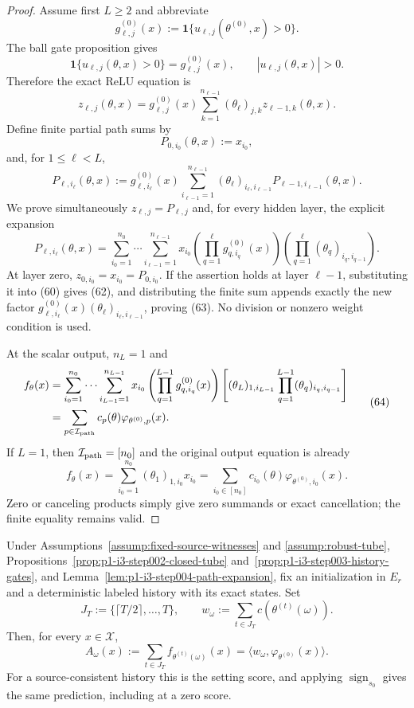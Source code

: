 \begin{proof}
Assume first $L\geq2$ and abbreviate
\[
g_{\ell,j}^{(0)}(x):=\mathbf1\{u_{\ell,j}(\theta^{(0)},x)>0\}.
\tag{58}
\]
The ball gate proposition gives
\[
\mathbf1\{u_{\ell,j}(\theta,x)>0\}=g_{\ell,j}^{(0)}(x),
\qquad |u_{\ell,j}(\theta,x)|>0.
\tag{59}
\]
Therefore the exact ReLU equation is
\[
z_{\ell,j}(\theta,x)=g_{\ell,j}^{(0)}(x)
\sum_{k=1}^{n_{\ell-1}}(\theta_\ell)_{j,k}
z_{\ell-1,k}(\theta,x).
\tag{60}
\]
Define finite partial path sums by
\[
P_{0,i_0}(\theta,x):=x_{i_0},
\tag{61}
\]
and, for $1\leq\ell<L$,
\[
P_{\ell,i_\ell}(\theta,x):=g_{\ell,i_\ell}^{(0)}(x)
\sum_{i_{\ell-1}=1}^{n_{\ell-1}}
(\theta_\ell)_{i_\ell,i_{\ell-1}}
P_{\ell-1,i_{\ell-1}}(\theta,x).
\tag{62}
\]
We prove simultaneously $z_{\ell,j}=P_{\ell,j}$ and, for every hidden
layer, the explicit expansion
\[
P_{\ell,i_\ell}(\theta,x)=
\sum_{i_0=1}^{n_0}\cdots\sum_{i_{\ell-1}=1}^{n_{\ell-1}}
x_{i_0}
\left(\prod_{q=1}^{\ell}g_{q,i_q}^{(0)}(x)\right)
\left(\prod_{q=1}^{\ell}(\theta_q)_{i_q,i_{q-1}}\right).
\tag{63}
\]
At layer zero, $z_{0,i_0}=x_{i_0}=P_{0,i_0}$.  If the assertion holds at
layer $\ell-1$, substituting it into (60) gives (62), and distributing the
finite sum appends exactly the new factor
$g_{\ell,i_\ell}^{(0)}(x)(\theta_\ell)_{i_\ell,i_{\ell-1}}$, proving (63).
No division or nonzero weight condition is used.

At the scalar output, $n_L=1$ and
\[
\begin{aligned}
f_\theta(x)
&=\sum_{i_0=1}^{n_0}\cdots\sum_{i_{L-1}=1}^{n_{L-1}}
x_{i_0}\left(\prod_{q=1}^{L-1}g_{q,i_q}^{(0)}(x)\right)
\left[(\theta_L)_{1,i_{L-1}}
\prod_{q=1}^{L-1}(\theta_q)_{i_q,i_{q-1}}\right]\\
&=\sum_{p\in\mathcal I_{\rm path}}c_p(\theta)
\varphi_{\theta^{(0)},p}(x).
\end{aligned}
\tag{64}
\]
If $L=1$, then $\mathcal I_{\rm path}=[n_0]$ and the original output equation
is already
\[
f_\theta(x)=\sum_{i_0=1}^{n_0}(\theta_1)_{1,i_0}x_{i_0}
=\sum_{i_0\in[n_0]}c_{i_0}(\theta)
\varphi_{\theta^{(0)},i_0}(x).
\tag{65}
\]
Zero or canceling products simply give zero summands or exact cancellation;
the finite equality remains valid.
\end{proof}

\begin{proposition}
\label{prop:p1-i3-step004-aggregate}
Under Assumptions~\ref{assump:fixed-source-witnesses} and
\ref{assump:robust-tube}, Propositions~\ref{prop:p1-i3-step002-closed-tube}
and~\ref{prop:p1-i3-step003-history-gates}, and
Lemma~\ref{lem:p1-i3-step004-path-expansion}, fix an initialization in $E_r$
and a deterministic labeled history with its exact states.  Set
\[
J_T:=\{\lceil T/2\rceil,\ldots,T\},
\qquad
w_\omega:=\sum_{t\in J_T}c(\theta^{(t)}(\omega)).
\tag{66}
\]
Then, for every $x\in\mathcal X$,
\[
A_\omega(x):=\sum_{t\in J_T}f_{\theta^{(t)}(\omega)}(x)
=\langle w_\omega,\varphi_{\theta^{(0)}}(x)\rangle.
\tag{67}
\]
For a source-consistent history this is the setting score, and applying
$\operatorname{sign}_{s_0}$ gives the same prediction, including at a zero
score.
\end{proposition}

